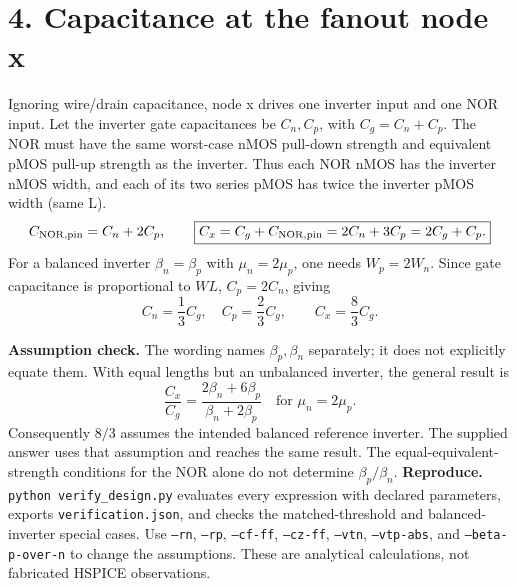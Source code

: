 \documentclass[11pt,a4paper]{article}
\begin{document}
\section*{4. Capacitance at the fanout node x}
Ignoring wire/drain capacitance, node x drives one inverter input and one NOR input. Let the inverter gate capacitances be $C_n,C_p$, with $C_g=C_n+C_p$. The NOR must have the same worst-case nMOS pull-down strength and equivalent pMOS pull-up strength as the inverter. Thus each NOR nMOS has the inverter nMOS width, and each of its two series pMOS has twice the inverter pMOS width (same L).
\[
 C_{\rm NOR,pin}=C_n+2C_p,\qquad
 \boxed{C_x=C_g+C_{\rm NOR,pin}=2C_n+3C_p=2C_g+C_p.}
\]
\newpage
For a balanced inverter $\beta_n=\beta_p$ with $\mu_n=2\mu_p$, one needs $W_p=2W_n$. Since gate capacitance is proportional to $WL$, $C_p=2C_n$, giving
\[
 C_n=\frac 13C_g,\quad C_p=\frac 23C_g,\qquad
 \boxed{C_x=\frac 83 C_g}.
\]
\begin{center}\end{center}
\textbf{Assumption check.} The wording names $\beta_p,\beta_n$ separately; it does not explicitly equate them. With equal lengths but an unbalanced inverter, the general result is
\[
 \frac{C_x}{C_g}=\frac{2\beta_n+6\beta_p}{\beta_n+2\beta_p}
 \quad\text{for }\mu_n=2\mu_p.
\]
Consequently $8/3$ assumes the intended balanced reference inverter. The supplied answer uses that assumption and reaches the same result. The equal-equivalent-strength conditions for the NOR alone do not determine $\beta_p/\beta_n$.
\textbf{Reproduce.} \texttt{python verify\_design.py} evaluates every expression with declared parameters, exports \texttt{verification.json}, and checks the matched-threshold and balanced-inverter special cases. Use \texttt{--rn}, \texttt{--rp}, \texttt{--cf-ff}, \texttt{--cz-ff}, \texttt{--vtn}, \texttt{--vtp-abs}, and \texttt{--beta-p-over-n} to change the assumptions. These are analytical calculations, not fabricated HSPICE observations.
\end{document}

